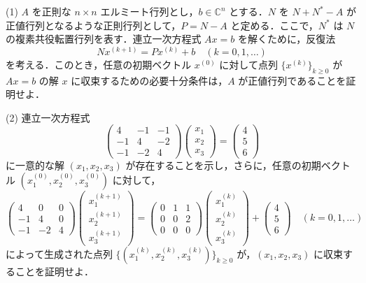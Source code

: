 \documentclass[12pt]{jlreq}
\newcommand{\C}{\mathbb{C}}
\begin{document}
(1) \(A\) を正則な \(n \times n\) エルミート行列とし，\(b \in \C^n\) とする．\(N\) を \(N + N^* - A\) が正値行列となるような正則行列として，\(P = N - A\) と定める．ここで，\(N^*\) は \(N\) の複素共役転置行列を表す．連立一次方程式 \(Ax = b\) を解くために，反復法
  \[
    Nx^{(k+1)} = Px^{(k)} + b \quad (k = 0, 1, \dots)
  \]
  を考える．このとき，任意の初期ベクトル \(x^{(0)}\) に対して点列 \(\{x^{(k)}\}_{k \ge 0}\) が \(Ax = b\) の解 \(x\) に収束するための必要十分条件は，\(A\) が正値行列であることを証明せよ．

(2) 連立一次方程式
  \[
    \begin{pmatrix} 4 & -1 & -1 \\ -1 & 4 & -2 \\ -1 & -2 & 4 \end{pmatrix} \begin{pmatrix} x_1 \\ x_2 \\ x_3 \end{pmatrix} = \begin{pmatrix} 4 \\ 5 \\ 6 \end{pmatrix}
  \]
  に一意的な解 \((x_1, x_2, x_3)\) が存在することを示し，さらに，任意の初期ベクトル \((x_1^{(0)}, x_2^{(0)}, x_3^{(0)})\) に対して，
  \[
    \begin{pmatrix} 4 & 0 & 0 \\ -1 & 4 & 0 \\ -1 & -2 & 4 \end{pmatrix} \begin{pmatrix} x_1^{(k+1)} \\ x_2^{(k+1)} \\ x_3^{(k+1)} \end{pmatrix} = \begin{pmatrix} 0 & 1 & 1 \\ 0 & 0 & 2 \\ 0 & 0 & 0 \end{pmatrix} \begin{pmatrix} x_1^{(k)} \\ x_2^{(k)} \\ x_3^{(k)} \end{pmatrix} + \begin{pmatrix} 4 \\ 5 \\ 6 \end{pmatrix} \quad (k = 0, 1, \dots)
  \]
  によって生成された点列 \(\{(x_1^{(k)}, x_2^{(k)}, x_3^{(k)})\}_{k \ge 0}\) が，\((x_1, x_2, x_3)\) に収束することを証明せよ．
\end{document}
